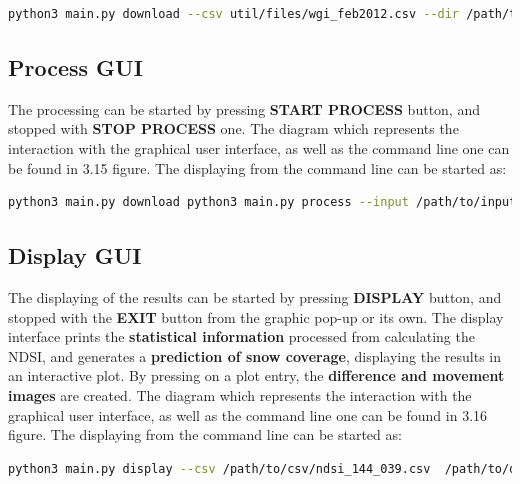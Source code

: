 \documentclass[12pt, a4paper]{report}
\begin{document}
	\begin{center}
		\begin{lstlisting}[language=bash,
		backgroundcolor = \color{babyblue}]
		python3 main.py download --csv util/files/wgi_feb2012.csv --dir /path/to/download/ -j 3
		\end{lstlisting}
	\end{center}
	
	\subsection{Process GUI}
	The processing can be started by pressing \textbf{START PROCESS} button, and stopped with \textbf{STOP PROCESS} one. The diagram which represents the interaction with the graphical user interface, as well as the command line one can be found in 3.15 figure. The displaying from the command line can be started as:
	
	\begin{center}
		\begin{lstlisting}[language=bash,
		backgroundcolor = \color{babyblue}]
		python3 main.py download python3 main.py process --input /path/to/input/images --output /path/to/download/ -j 3
		\end{lstlisting}
	\end{center}
	
	\subsection{Display GUI}
	The displaying of the results can be started by pressing \textbf{DISPLAY} button, and stopped with the \textbf{EXIT} button from the graphic pop-up or its own. The display interface prints the \textbf{statistical information} processed from calculating the NDSI, and generates a \textbf{prediction of snow coverage}, displaying the results in an interactive plot. By pressing on a plot entry, the \textbf{difference and movement images} are created. The diagram which represents the interaction with the graphical user interface, as well as the command line one can be found in 3.16 figure. The displaying from the command line can be started as:
	
	\begin{center}
		\begin{lstlisting}[language=bash,
		backgroundcolor = \color{babyblue}]
		python3 main.py display --csv /path/to/csv/ndsi_144_039.csv  /path/to/download/images -j 3
		\end{lstlisting}
	\end{center}
	
\end{document}
